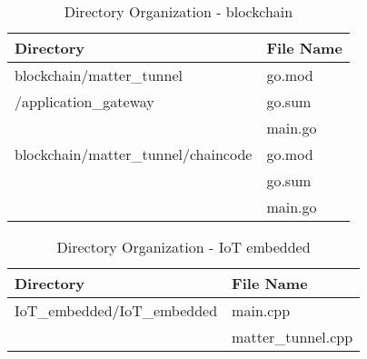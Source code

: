 \documentclass[conference]{IEEEtran}
\begin{document}
\begin{table}[h]
	\caption{Directory Organization - blockchain}
	\def\arraystretch{1.24} \small
	\begin{tabular}{|p{5cm}|p{2.5cm}|}
		\hline
		Directory                           & File Name \\
		\hline
		blockchain/matter\_tunnel           & go.mod    \\
		/application\_gateway               & go.sum    \\
		                                    & main.go   \\
		\hline
		blockchain/matter\_tunnel/chaincode & go.mod    \\
		                                    & go.sum    \\
		                                    & main.go   \\
		\hline
	\end{tabular}
\end{table}

\begin{table}[h]
	\caption{Directory Organization - IoT embedded}
	\def\arraystretch{1.24} \small
	\begin{tabular}{|p{5cm}|p{2.5cm}|}
		\hline
		Directory                   & File Name          \\
		\hline
		IoT\_embedded/IoT\_embedded & main.cpp           \\
		                            & matter\_tunnel.cpp \\
		\hline
	\end{tabular}
\end{table}

\vspace{10cm}
\end{document}
